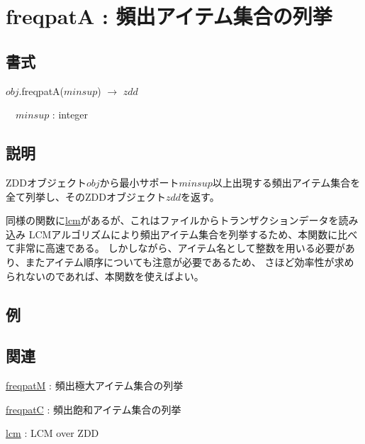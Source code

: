 
\section{freqpatA : 頻出アイテム集合の列挙\label{sect:freqpatA}}
\subsection*{書式}
$obj$.freqpatA($minsup$) $\rightarrow$ $zdd$

~~$minsup$ : integer

\subsection*{説明}
ZDDオブジェクト$obj$から最小サポート$minsup$以上出現する頻出アイテム集合を全て列挙し、そのZDDオブジェクト$zdd$を返す。

同様の関数に\hyperref[sect:lcm]{lcm}があるが、これはファイルからトランザクションデータを読み込み
LCMアルゴリズムにより頻出アイテム集合を列挙するため、本関数に比べて非常に高速である。
しかしながら、アイテム名として整数を用いる必要があり、またアイテム順序についても注意が必要であるため、
さほど効率性が求められないのであれば、本関数を使えばよい。

\subsection*{例}


\subsection*{関連}
\hyperref[sect:freqpatM]{freqpatM} : 頻出極大アイテム集合の列挙

\hyperref[sect:freqpatC]{freqpatC} : 頻出飽和アイテム集合の列挙

\hyperref[sect:lcm]{lcm} : LCM over ZDD

